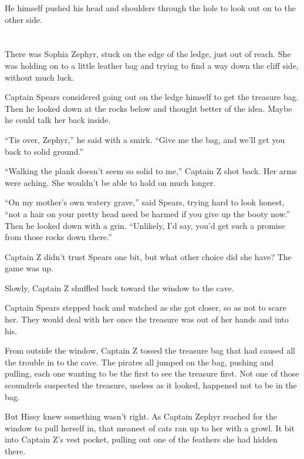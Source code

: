 \documentclass[12pt]{extbook}
\begin{document}
  He himself pushed his head and shoulders through the hole to look out on
  to the other side.
  
  \section{}\label{section-21}
  
  There was Sophia Zephyr, stuck on the edge of the ledge, just out of
  reach. She was holding on to a little leather bag and trying to find a
  way down the cliff side, without much luck.
  
  Captain Spears considered going out on the ledge himself to get the
  treasure bag. Then he looked down at the rocks below and thought better
  of the idea. Maybe he could talk her back inside.
  
  \enquote{Tis over, Zephyr,} he said with a smirk. \enquote{Give me the
  bag, and we'll get you back to solid ground.}
  
  \enquote{Walking the plank doesn't seem so solid to me,} Captain Z shot
  back. Her arms were aching. She wouldn't be able to hold on much longer.
  
  \enquote{On my mother's own watery grave,} said Spears, trying hard to
  look honest, \enquote{not a hair on your pretty head need be harmed if
  you give up the booty now.} Then he looked down with a grin.
  \enquote{Unlikely, I'd say, you'd get such a promise from those rocks
  down there.}
  
  Captain Z didn't trust Spears one bit, but what other choice did she
  have? The game was up.
  
  Slowly, Captain Z shuffled back toward the window to the cave.
  
  Captain Spears stepped back and watched as she got closer, so as not to
  scare her. They would deal with her once the treasure was out of her
  hands and into his.
  
  From outside the window, Captain Z tossed the treasure bag that had
  caused all the trouble in to the cave. The pirates all jumped on the
  bag, pushing and pulling, each one wanting to be the first to see the
  treasure first. Not one of those scoundrels suspected the treasure,
  useless as it looked, happened not to be in the bag.
  
  But Hissy knew something wasn't right. As Captain Zephyr reached for the
  window to pull herself in, that meanest of cats ran up to her with a
  growl. It bit into Captain Z's vest pocket, pulling out one of the
  feathers she had hidden there.
  
\end{document}
